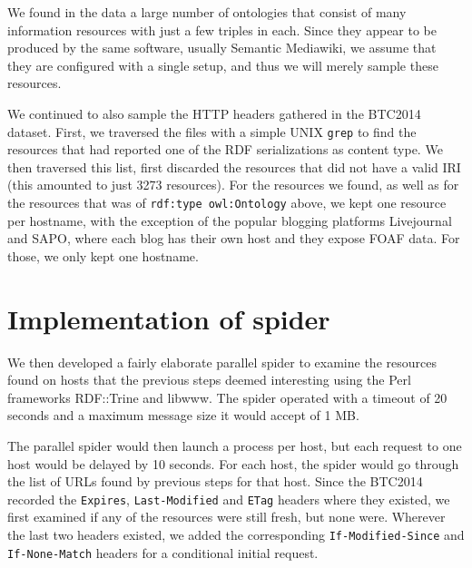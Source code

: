 \documentclass{llncs}
\newcommand{\rdfterm}[1]{\texttt{#1}}
\newcommand{\httph}[1]{\texttt{#1}}
\begin{document}
\begin{subappendices}
We found in the data a large number of ontologies that consist of many
information resources with just a few triples in each. Since they
appear to be produced by the same software, usually Semantic
Mediawiki, we assume that they are configured with a single setup, and
thus we will merely sample these resources.

We continued to also sample the HTTP headers gathered in the BTC2014
dataset. 
First, we traversed the files with a simple UNIX \texttt{grep} to find
the resources that had reported one of the RDF serializations as
content type. We then traversed this list, first discarded the
resources that did not have a valid IRI (this amounted to just 3273
resources). For the resources we found, as well as for the resources
that was of \rdfterm{rdf:type owl:Ontology} above, we kept one
resource per hostname, with the exception of the popular blogging
platforms Livejournal and SAPO, where each blog has their own host and
they expose FOAF data. For those, we only kept one hostname. 

\section{Implementation of spider}\label{app:fetcher}

We then developed a fairly elaborate parallel spider to examine the
resources found on hosts that the previous steps deemed interesting
using the Perl frameworks RDF::Trine and libwww. The spider operated
with a timeout of 20 seconds and a maximum message size it would
accept of 1 MB.

The parallel spider would then launch a process per host, but each
request to one host would be delayed by 10 seconds. For each host, the
spider would go through the list of URLs found by previous steps for
that host. Since the BTC2014 recorded the \httph{Expires},
\httph{Last-Modified} and \httph{ETag} headers where they existed, we
first examined if any of the resources were still fresh, but none
were. Wherever the last two headers existed, we added the
corresponding \httph{If-Modified-Since} and \httph{If-None-Match}
headers for a conditional initial request.


\end{subappendices}
\end{document}
